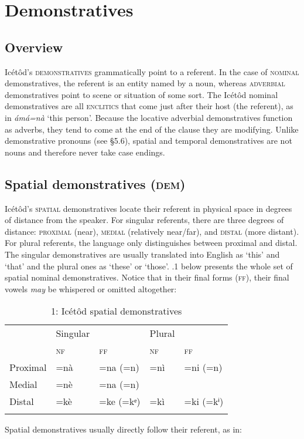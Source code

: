 \section{Demonstratives}



\subsection{Overview}


Icétôd’s \textsc{demonstratives} grammatically point to a referent. In the case of \textsc{nominal} demonstratives, the referent is an entity named by a noun, whereas \textsc{adverbial} demonstratives point to scene or situation of some sort. The Icétôd nominal demonstratives are all \textsc{enclitics} that come just after their host (the referent), as in \textit{ámá=nà} ‘this person’. Because the locative adverbial demonstratives function as adverbs, they tend to come at the end of the clause they are modifying. Unlike demonstrative pronouns (see §5.6), spatial and temporal demonstratives are not nouns and therefore never take case endings.




\subsection{Spatial demonstratives (\textsc{dem})}


Icétôd’s \textsc{spatial} demonstratives locate their referent in physical space in degrees of distance from the speaker. For singular referents, there are three degrees of distance: \textsc{proximal} (near), \textsc{medial} (relatively near/far), and \textsc{distal} (more distant). For plural referents, the language only distinguishes between proximal and distal. The singular demonstratives are usually translated into English as ‘this’ and ‘that’ and the plural ones as ‘these’ or ‘those’. .1 below presents the whole set of spatial nominal demonstratives. Notice that in their final forms (\textsc{ff}), their final vowels \textit{may} be whispered or omitted altogether:


\begin{table}
\caption{1: Icétôd spatial demonstratives}
\label{tab:6}


\begin{tabularx}{\textwidth}{XXXXX} & Singular &  & Plural & \\
\lsptoprule
& \textsc{nf} & \textsc{ff} & \textsc{nf} & \textsc{ff}\\
Proximal & =nà & =na (=n) & =nì & =ni (=n)\\
Medial & =nè & =na (=n) &  & \\
Distal & =kè & =ke (=kᵉ) & =kì & =ki (=kⁱ)\\
\lspbottomrule
\end{tabularx}
\end{table}
Spatial demonstratives usually directly follow their referent, as in:




